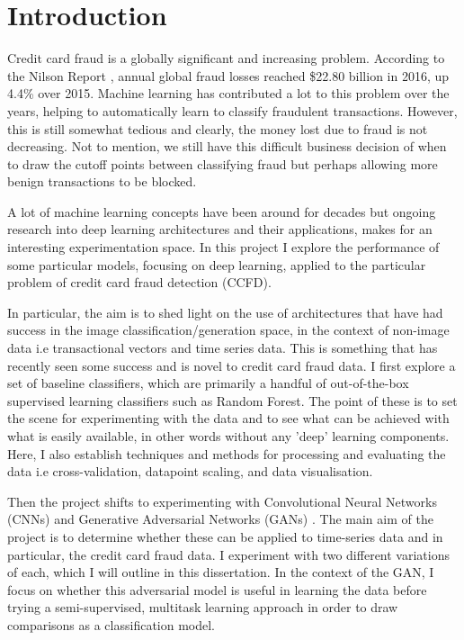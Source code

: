 \documentclass[12pt,a4paper,twoside]{report}
\begin{document}
\tableofcontents

\pagestyle{headings} 

\chapter{Introduction}

Credit card fraud is a globally significant and increasing problem. According to the Nilson Report \cite{nilsonreport}, annual global fraud losses reached \$22.80 billion in 2016, up 4.4\% over 2015. Machine learning has contributed a lot to this problem over the years, helping to automatically learn to classify fraudulent transactions. However, this is still somewhat tedious and clearly, the money lost due to fraud is not decreasing. Not to mention, we still have this difficult business decision of when to draw the cutoff points between classifying fraud but perhaps allowing more benign transactions to be blocked.

A lot of machine learning concepts have been around for decades but ongoing research into deep learning architectures and their applications, makes for an interesting experimentation space. In this project I explore the performance of some particular models, focusing on deep learning, applied to the particular problem of credit card fraud detection (CCFD).

In particular, the aim is to shed light on the use of architectures that have had success in the image classification/generation space, in the context of non-image data i.e transactional vectors and time series data.
This is something that has recently seen some success \cite{wang2017time} and is novel to credit card fraud data. 
I first explore a set of baseline classifiers, which are primarily a handful of out-of-the-box supervised learning classifiers such as Random Forest. The point of these is to set the scene for experimenting with the data and to see what can be achieved with what is easily available, in other words without any 'deep' learning components. Here, I also establish techniques and methods for processing and evaluating the data i.e cross-validation, datapoint scaling, and data visualisation. 

Then the project shifts to experimenting with Convolutional Neural Networks (CNNs) \cite{DBLP:journals/corr/SimonyanZ14a} and Generative Adversarial Networks (GANs) \cite{2014arXiv1406.2661G}. The main aim of the project is to determine whether these can be applied to time-series data and in particular, the credit card fraud data. I experiment with two different variations of each, which I will outline in this dissertation. In the context of the GAN, I focus on whether this adversarial model is useful in learning the data before trying a semi-supervised, multitask learning approach in order to draw comparisons as a classification model.  
\end{document}

